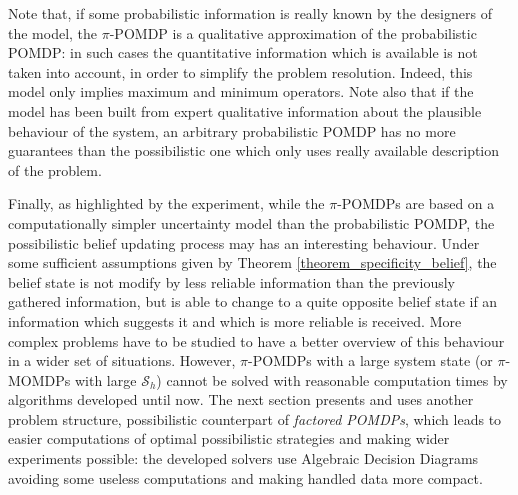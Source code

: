 Note that, if some probabilistic information 
is really known by the designers of the model,
the $\pi$-POMDP is a qualitative approximation
of the probabilistic POMDP: in such cases
the quantitative information which is available
is not taken into account, in order to simplify 
the problem resolution.
Indeed, this model only implies maximum and minimum operators.
Note also that if the model has been built from expert 
qualitative information about the plausible behaviour of the system,
an arbitrary probabilistic POMDP has no more guarantees than
the possibilistic one 
which only uses really available description of the problem.

Finally, as highlighted by the experiment,
while the $\pi$-POMDPs are
based on a computationally simpler uncertainty model 
than the probabilistic POMDP,
the possibilistic belief updating process may 
has an interesting behaviour.
Under some sufficient assumptions
given by Theorem \ref{theorem_specificity_belief},
the belief state is not modify by less reliable information
than the previously gathered information, 
but is able to change to a quite opposite belief state
if an information which suggests it and which is more reliable is received.
More complex problems have to be studied 
to have a better overview of this behaviour
in a wider set of situations.
However, $\pi$-POMDPs with a large system state
(or $\pi$-MOMDPs with large $\mathcal{S}_h$) 
cannot be solved with reasonable computation times 
by algorithms developed until now.
The next section presents and uses another problem structure,
possibilistic counterpart of \textit{factored POMDPs},
which leads to easier computations of optimal possibilistic strategies 
and making wider experiments possible:
the developed solvers use Algebraic Decision Diagrams
avoiding some useless computations
and making handled data more compact.
